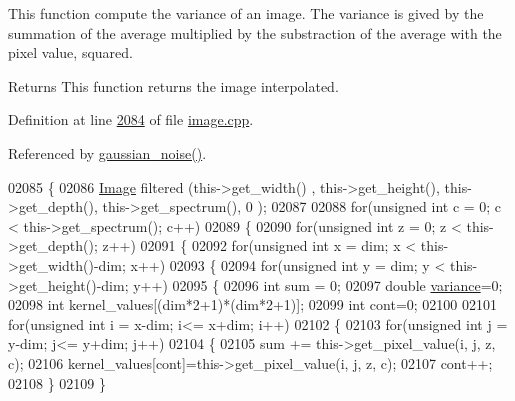 This function compute the variance of an image. The variance is gived by the summation of the average multiplied by the substraction of the average with the pixel value, squared. 

\begin{DoxyReturn}{Returns}
This function returns the image interpolated. 
\end{DoxyReturn}


Definition at line \hyperlink{image_8cpp_source_l02084}{2084} of file \hyperlink{image_8cpp_source}{image.\-cpp}.



Referenced by \hyperlink{image_8cpp_source_l01970}{gaussian\-\_\-noise()}.


\begin{DoxyCode}
02085 \{
02086     \hyperlink{class_image}{Image} filtered (this->get\_width() , this->get\_height(), this->get\_depth(), this->get\_spectrum(), 0
      ); 
02087     
02088     \textcolor{keywordflow}{for}(\textcolor{keywordtype}{unsigned} \textcolor{keywordtype}{int} c = 0; c < this->get\_spectrum(); c++)
02089     \{
02090         \textcolor{keywordflow}{for}(\textcolor{keywordtype}{unsigned} \textcolor{keywordtype}{int} z = 0; z < this->get\_depth(); z++)
02091         \{
02092             \textcolor{keywordflow}{for}(\textcolor{keywordtype}{unsigned} \textcolor{keywordtype}{int} x = dim; x < this->get\_width()-dim; x++)
02093             \{
02094                 \textcolor{keywordflow}{for}(\textcolor{keywordtype}{unsigned} \textcolor{keywordtype}{int} y = dim; y < this->get\_height()-dim; y++)
02095                 \{
02096                     \textcolor{keywordtype}{int} sum = 0;
02097                     \textcolor{keywordtype}{double} \hyperlink{class_image_aad9aac9600334fb18ae54e4807a12dc5}{variance}=0;
02098                     \textcolor{keywordtype}{int} kernel\_values[(dim*2+1)*(dim*2+1)];
02099                     \textcolor{keywordtype}{int} cont=0;
02100 
02101                     \textcolor{keywordflow}{for}(\textcolor{keywordtype}{unsigned} \textcolor{keywordtype}{int} i = x-dim; i<= x+dim; i++)
02102                     \{
02103                         \textcolor{keywordflow}{for}(\textcolor{keywordtype}{unsigned} \textcolor{keywordtype}{int} j = y-dim; j<= y+dim; j++)
02104                         \{
02105                             sum += this->get\_pixel\_value(i, j, z, c);
02106                             kernel\_values[cont]=this->get\_pixel\_value(i, j, z, c);
02107                             cont++;
02108                         \}
02109                     \}

\end{DoxyCode}
